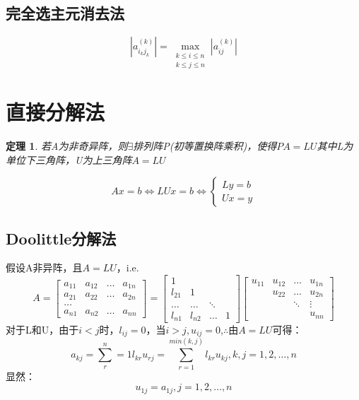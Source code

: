 \documentclass[a4paper]{article}
\newtheorem{theorem}{定理}[section]
\begin{document}
\subsection{完全选主元消去法}
$$|a^{(k)}_{i_kj_k}| = \max_{\substack{k \le i \le n \\ k\le j \le n}} |a^{(k)}_{ij}|$$

\section{直接分解法}

\begin{theorem}
  若A为非奇异阵，则$\exists$排列阵P(初等置换阵乘积)，使得$PA=LU$其中L为单位下三角阵，U为上三角阵$A=LU$
\end{theorem}

\begin{equation*}
  Ax=b \Leftrightarrow LUx = b \Leftrightarrow \left\{
    \begin{array}{lr}
      Ly = b \\
      Ux = y 
    \end{array}
    \right.
\end{equation*}

\subsection{Doolittle分解法}
假设A非异阵，且$A=LU$，i.e.
$$
A = \left[
  \begin{matrix}
    a_{11} & a_{12} & \dots & a_{1n} \\
    a_{21} & a_{22} & \dots & a_{2n} \\
    \dots \\
    a_{n1} & a_{n2} & \dots & a_{nn}
  \end{matrix}\right]=\left[
    \begin{matrix}
      1 \\
      l_{21} & 1 \\
      \dots & \dots & \ddots \\
      l_{n1} & l_{n2} & \dots & 1 
    \end{matrix}\right]
    \left[
      \begin{matrix}
        u_{11} & u_{12} & \dots & u_{1n} \\
        ~ & u_{22} & \dots & u_{2n} \\
        ~ & ~ & \ddots & \vdots \\
        ~ & ~ & ~ & u_{nn}
      \end{matrix}
      \right]
$$
对于L和U，由于$i<j$时，$l_{ij}=0$，当$i>j, u_{ij}=0$,$\therefore$由$A=LU$可得：
\begin{equation}
  a_{kj} = \sum^n_r=1l_{kr}u_{rj} = \sum_{r=1}^{min(k,j)}l_{kr}u_{kj}, k,j = 1,2,\dots, n
  \label{eq:4.1}
\end{equation}
显然：
\begin{equation}
  u_{1j}=a_{1j},j=1,2,\dots, n 
  \label{eq:4.2}
\end{equation}
\end{document}
